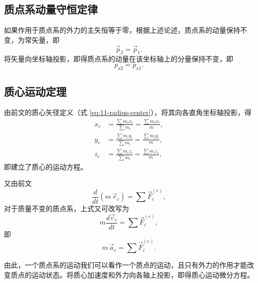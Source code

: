 \subsection{质点系动量守恒定律}

如果作用于质点系的外力的主矢恒等于零，根据上述论述，质点系的动量保持不变，为常矢量，即
\begin{equation}\label{eq:11-conservation}
  \vec{p}_2=\vec{p}_1.
\end{equation}
将矢量向坐标轴投影，即得质点系的动量在该坐标轴上的分量保持不变，即
\begin{equation}\label{eq:11-conservation-x}
  p_{x2}=p_{x1}.
\end{equation}

\subsection{质心运动定理}

由前文的质心矢径定义（式 \eqref{eq:11-radius-center}），将其向各直角坐标轴投影，得
\begin{equation}\label{eq:11-cm-coordinate}
\begin{aligned}
  x_c &= \frac{\sum m_i x_i}{\sum m_i}=\frac{\sum m_i x_i}{m},\\
  y_c &= \frac{\sum m_i y_i}{\sum m_i}=\frac{\sum m_i y_i}{m},\\
  z_c &= \frac{\sum m_i z_i}{\sum m_i}=\frac{\sum m_i z_i}{m},
\end{aligned}
\end{equation}
即建立了质心的运动方程。

又由前文
\begin{equation}\label{eq:11-cm-dt}
  \frac{d}{dt}\left(m\,\vec{r}_c\right)=\sum\vec{F}_i^{(e)},
\end{equation}
对于质量不变的质点系，上式又可改写为
\begin{equation}\label{eq:11-cm-v}
  m\frac{d\vec{v}_c}{dt}=\sum\vec{F}_i^{(e)},
\end{equation}
即
\begin{equation}\label{eq:11-cm-a}
  m\,\vec{a}_c=\sum\vec{F}_i^{(e)}.
\end{equation}

由此，一个质点系的运动我们可以看作一个质点的运动，且只有外力的作用才能改变质点的运动状态。将质心加速度和外力向各轴上投影，即得质心运动微分方程。
